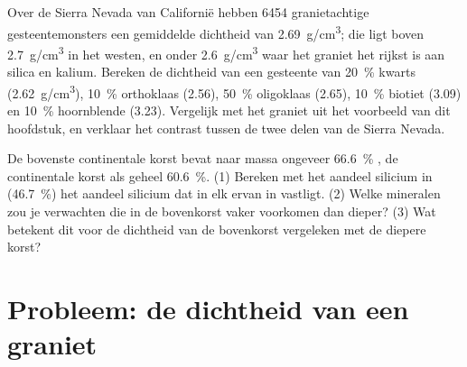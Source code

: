 \begin{exercise}[$\star\star\star$]\label{exo:g11:minerals:14}
Over de Sierra Nevada van Californië hebben \num{6454} granietachtige gesteentemonsters
een gemiddelde dichtheid van \qty{2.69}{g/cm^3}; die ligt boven \qty{2.7}{g/cm^3} in
het westen, en onder \qty{2.6}{g/cm^3} waar het graniet het rijkst is aan silica
en kalium. Bereken de dichtheid van een gesteente van \qty{20}{\percent} kwarts
(\qty{2.62}{g/cm^3}), \qty{10}{\percent} orthoklaas (\qty{2.56}{}),
\qty{50}{\percent} oligoklaas (\qty{2.65}{}), \qty{10}{\percent} biotiet
(\qty{3.09}{}) en \qty{10}{\percent} hoornblende (\qty{3.23}{}). Vergelijk
met het graniet uit het voorbeeld van dit hoofdstuk, en verklaar het contrast
tussen de twee delen van de Sierra Nevada.
\end{exercise}

\begin{exercise}[$\star\star\star$]\label{exo:g11:minerals:15}
De bovenste continentale korst bevat naar massa ongeveer \qty{66.6}{\percent} ,
de continentale korst als geheel \qty{60.6}{\percent}. (1) Bereken met
het aandeel silicium in  (\qty{46.7}{\percent}) het aandeel
silicium dat in elk ervan in  vastligt. (2) Welke mineralen zou je verwachten
die in de bovenkorst vaker voorkomen dan dieper? (3) Wat betekent dit
voor de dichtheid van de bovenkorst vergeleken met de diepere korst?
\end{exercise}

\section{Probleem: de dichtheid van een graniet}

